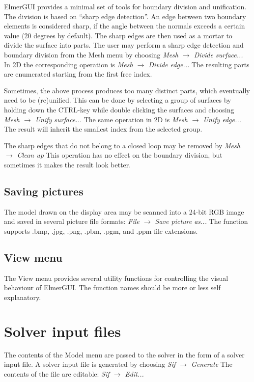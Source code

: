 \documentclass[a4paper,12pt]{article}
\newcommand{\menu}[2]{{\it \vskip2mm #1 $\rightarrow$ #2 \vskip2mm}}
\begin{document}
ElmerGUI provides a minimal set of tools for boundary division and unification. The
division is based on ``sharp edge detection''. An edge between two boundary elements
is considered sharp, if the angle between the normals exceeds a certain value (20
degrees by default). The sharp edges are then used as a mortar to divide the surface
into parts. The user may perform a sharp edge detection and boundary division from
the Mesh menu by choosing
\menu{Mesh}{Divide surface...}
\noindent In 2D the corresponding operation is
\menu{Mesh}{Divide edge...}
\noindent The resulting parts are enumerated starting from the first free index.

Sometimes, the above process produces too many distinct parts, which eventually need to
be (re)unified. This can be done by selecting a group of surfaces by holding down the
CTRL-key while double clicking the surfaces and choosing
\menu{Mesh}{Unify surface...}
\noindent The same operation in 2D is
\menu{Mesh}{Unify edge...}
\noindent The result will inherit the smallest index from the selected group.

The sharp edges that do not belong to a closed loop may be removed by
\menu{Mesh}{Clean up}
\noindent This operation has no effect on the boundary division, but sometimes it makes
the result look better.

\subsection{Saving pictures}

The model drawn on the display area may be scanned into a 24-bit RGB image and saved in
several picture file formats:
\menu{File}{Save picture as...}
\noindent The function supports .bmp, .jpg, .png, .pbm, .pgm, and .ppm file extensions.

\subsection{View menu}

The View menu provides several utility functions for controlling the visual behaviour
of ElmerGUI. The function names should be more or less self explanatory.

\section{Solver input files}

The contents of the Model menu are passed to the solver in the form of a solver
input file. A solver input file is generated by choosing
\menu{Sif}{Generate}
\noindent The contents of the file are editable:
\menu{Sif}{Edit...}
\end{document}
